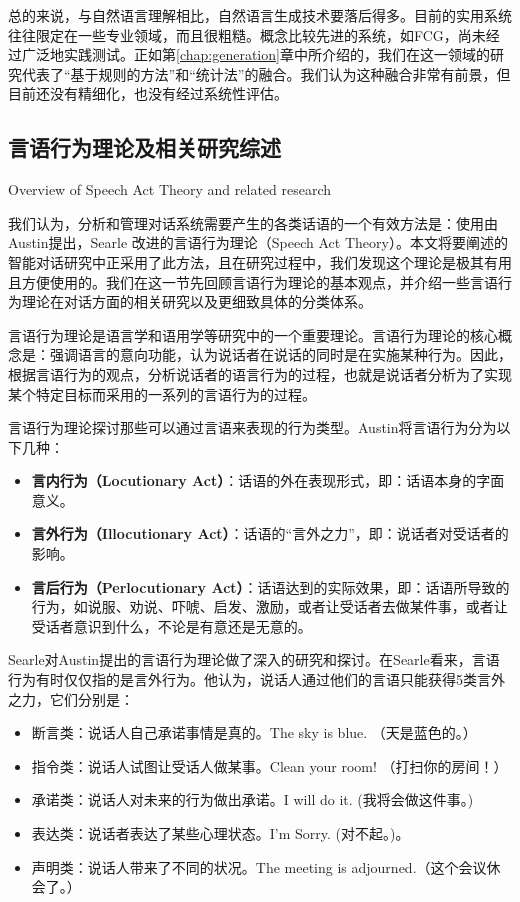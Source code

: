 总的来说，与自然语言理解相比，自然语言生成技术要落后得多。目前的实用系统往往限定在一些专业领域，而且很粗糙。概念比较先进的系统，如FCG，尚未经过广泛地实践测试。正如第\ref{chap:generation}章中所介绍的，我们在这一领域的研究代表了“基于规则的方法”和“统计法”的融合。我们认为这种融合非常有前景，但目前还没有精细化，也没有经过系统性评估。

\subsection{言语行为理论及相关研究综述}{Overview of Speech Act Theory and related research}
\label{sec:speechAct}

我们认为，分析和管理对话系统需要产生的各类话语的一个有效方法是：使用由Austin\cite{Austin2005}提出，Searle\cite{Searle1969} 改进的言语行为理论（Speech Act Theory）。本文将要阐述的智能对话研究中正采用了此方法，且在研究过程中，我们发现这个理论是极其有用且方便使用的。我们在这一节先回顾言语行为理论的基本观点，并介绍一些言语行为理论在对话方面的相关研究以及更细致具体的分类体系。

言语行为理论是语言学和语用学等研究中的一个重要理论。言语行为理论的核心概念是：强调语言的意向功能，认为说话者在说话的同时是在实施某种行为。因此，根据言语行为的观点，分析说话者的语言行为的过程，也就是说话者分析为了实现某个特定目标而采用的一系列的言语行为的过程。

言语行为理论探讨那些可以通过言语来表现的行为类型。Austin\cite{Austin2005}将言语行为分为以下几种：

\begin{itemize}
\item {\bf 言内行为（Locutionary Act）}：话语的外在表现形式，即：话语本身的字面意义。
\item {\bf 言外行为（Illocutionary Act）}：话语的“言外之力”，即：说话者对受话者的影响。
\item {\bf 言后行为（Perlocutionary Act）}：话语达到的实际效果，即：话语所导致的行为，如说服、劝说、吓唬、启发、激励，或者让受话者去做某件事，或者让受话者意识到什么，不论是有意还是无意的。
\end{itemize}

Searle对Austin提出的言语行为理论做了深入的研究和探讨。在Searle\cite{Searle1969}看来，言语行为有时仅仅指的是言外行为。他认为，说话人通过他们的言语只能获得5类言外之力，它们分别是：

\begin{itemize}
\item 断言类：说话人自己承诺事情是真的。The sky is blue. （天是蓝色的。）
\item 指令类：说话人试图让受话人做某事。Clean your room! （打扫你的房间！）
\item 承诺类：说话人对未来的行为做出承诺。I will do it. (我将会做这件事。)
\item 表达类：说话者表达了某些心理状态。I’m Sorry. (对不起。)。
\item 声明类：说话人带来了不同的状况。The meeting is adjourned.（这个会议休会了。）
\end{itemize}

